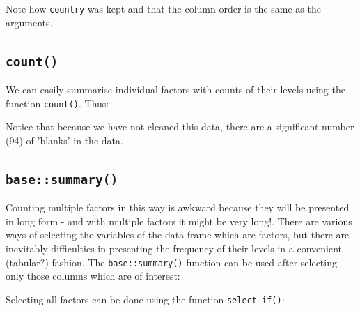 \documentclass[titlepage]{book}\usepackage{knitr}
\begin{document}
Note how \texttt{country} was kept and that the column order is the same as the arguments.

\subsection{\texttt{count()}}
We can easily summarise individual factors with counts of their levels using the function \texttt{count()}.  Thus:

\begin{knitrout}
\color{fgcolor}\begin{kframe}
\begin{alltt}
  \hlkwb{<-}      
\end{alltt}
\end{kframe}
\end{knitrout}
Notice that because we have not cleaned this data, there are a significant number (94) of 'blanks' in the data.

\subsection{\texttt{base::summary()}}

Counting multiple factors in this way is awkward because they will be presented in long form - and with multiple factors it might be very long!. There are various ways of selecting the variables of the data frame which are factors, but there are inevitably difficulties in presenting the frequency of their levels in a convenient (tabular?) fashion. The \texttt{base::summary()} function can be used after selecting only those columns which are of interest:
\begin{knitrout}
\color{fgcolor}\begin{kframe}
\begin{alltt}
\hlstd{(}
\end{alltt}
\end{kframe}
\end{knitrout}

Selecting all factors can be done using the function \texttt{select\_if()}:
\begin{knitrout}
\color{fgcolor}\begin{kframe}
\begin{alltt}
\hlstd{(}
\end{alltt}
\end{kframe}
\end{knitrout}
\end{document}
